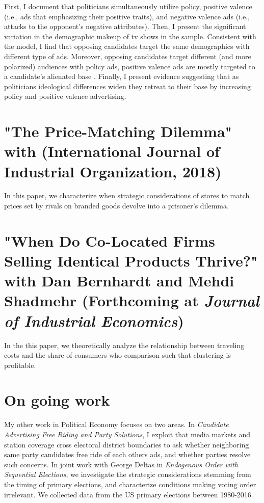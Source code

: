 \documentclass[12pt]{article}
\begin{document}
First, I document that politicians simultaneously utilize policy, positive valence (i.e., ads that emphasizing their positive traits), and negative valence ads (i.e., attacks to the opponent's negative attributes).
Then, I present the significant variation in the demographic makeup of tv shows in the sample. 
Consistent with the model, I find that opposing candidates target the same demographics with different type of ads.
Moreover, opposing candidates target different (and more polarized) audiences with policy ads, positive valence ads are mostly targeted to a candidate’s alienated base .
Finally, I present evidence suggesting that as politicians ideological differences widen they retreat to their base by increasing policy and positive valence advertising.






\vspace{0.25cm}
\section{"The Price-Matching Dilemma" with (International Journal of Industrial Organization, 2018)}
\label{sec:org864cfad}
\vspace{0.1cm}
\noindent In this paper, we characterize when strategic considerations of stores to match prices set by rivals on branded goods devolve into a prisoner’s dilemma.

\vspace{0.25cm}
\section{"When Do Co-Located Firms Selling Identical Products Thrive?" with Dan Bernhardt and Mehdi Shadmehr (Forthcoming at \emph{Journal of Industrial Economics})}
\label{sec:orgfb75ccb}
\vspace{0.1cm}

\noindent In the this paper, we theoretically analyze the relationship between traveling costs and the share of consumers who comparison such that clustering is profitable.

\vspace{0.25cm}
\section{On going work}
\label{sec:org47e9195}
\vspace{0.1cm}

My other work in Political Economy focuses on two areas. In \emph{Candidate Advertising Free Riding and Party Solutions},
I exploit that media markets and station coverage cross electoral district boundaries to ask whether neighboring same party candidates free ride of each others ads, and whether parties resolve such concerns.
In joint work with George Deltas in \emph{Endogenous Order with Sequential Elections},  we investigate the strategic considerations stemming from the timing of primary elections, and characterize conditions making voting order irrelevant.
We collected data from the US primary elections between 1980-2016.
\end{document}
